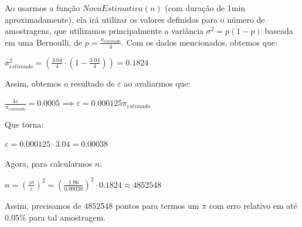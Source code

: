 \documentclass[a4paper]{article}
\begin{document}
\vspace{0.5cm}

Ao usarmos a função $NovaEstimativa(n)$ (com duração de 1min aproximadamente), ela irá utilizar os valores definidos para o número de amostragens, que utilizamos principalmente a variância $\sigma^2 = p(1-p)$ baseada em uma Bernoulli, de $p = \frac{\pi_{estimado}}{4}$. Com os dados mencionados, obtemos que:

\begin{center}

$\sigma_{estimado}^2 = (\frac{3.04}{4} \cdot (1-\frac{3.04}{4})) = 0.1824 $

\end{center}

Assim, obtemos o resultado de $\varepsilon$ ao avaliarmos que: 

\begin{center}

$\frac{4\varepsilon}{\pi_{estimado}} = 0.0005 \implies \varepsilon = 0.000125\pi_{estimado} $

\end{center}

Que torna:

\begin{center}

$\varepsilon = 0.000125 \cdot 3.04 = 0.00038$

\end{center}

Agora, para calcularmos $n$:

\begin{center}

$n = (\frac{z\sigma}{\varepsilon})^2 = (\frac{1.96}{0.00038})^2\cdot0.1824 \approx 4852548 $ 

\end{center}

Assim, precisamos de $4852548$ pontos para termos um $\pi$ com  erro relativo em até $0.05\%$ para tal amostragem.
\end{document}
